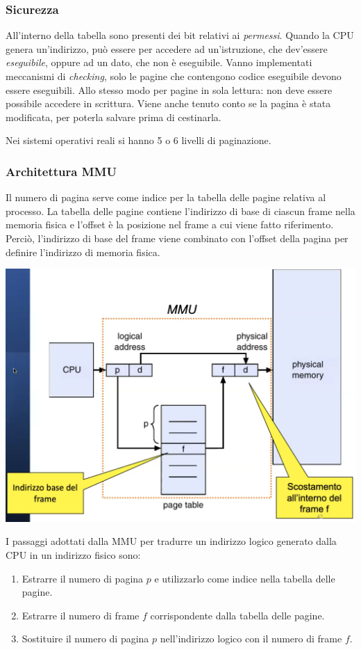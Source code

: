\documentclass[a4paper,12pt, twoside]{report}
\begin{document}
\subsubsection{Sicurezza}

All'interno della tabella sono presenti dei bit relativi ai \emph{permessi}. Quando la CPU genera un'indirizzo, pu\`o 
essere per accedere ad un'istruzione, che dev'essere \emph{eseguibile}, oppure ad un dato, che non \`e eseguibile.
Vanno implementati meccanismi di \emph{checking}, solo le pagine che contengono codice eseguibile devono essere
eseguibili. Allo stesso modo per pagine in sola lettura: non deve essere possibile accedere in scrittura.
Viene anche tenuto conto se la pagina \`e stata modificata, per poterla salvare prima di cestinarla.

Nei sistemi operativi reali si hanno 5 o 6 livelli di paginazione.

\subsubsection{Architettura MMU}

Il numero di pagina serve come indice per la tabella delle pagine relativa
al processo. La tabella delle pagine contiene l'indirizzo di base di 
ciascun frame nella memoria fisica e l'offset \`e la posizione nel frame a 
cui viene fatto riferimento. Perci\`o, l'indirizzo di base del frame viene 
combinato con l'offset della pagina per definire l'indirizzo di memoria 
fisica.

\includegraphics[scale=.2]{page_mmu}

I passaggi adottati dalla MMU per tradurre un indirizzo logico generato dalla CPU in un indirizzo fisico sono:
\begin{enumerate}
\item Estrarre il numero di pagina $p$ e utilizzarlo come indice nella tabella delle pagine.
\item Estrarre il numero di frame $f$ corrispondente dalla tabella delle pagine.
\item Sostituire il numero di pagina $p$ nell'indirizzo logico con il numero di frame $f$. 
\end{enumerate}
\end{document}
